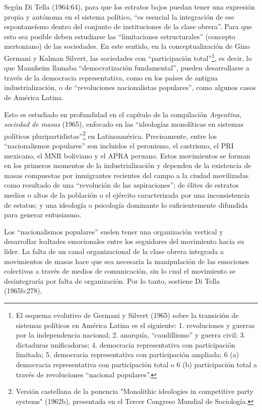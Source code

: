 Según Di Tella (1964:64), para que los estratos bajos puedan tener una expresión propia y autónoma en el sistema político, ``es esencial la integración de ese espontaneísmo dentro del conjunto de instituciones de la clase obrera''. Para que esto sea posible deben estudiarse las ``limitaciones estructurales'' (concepto mertoniano) de las sociedades. En este sentido, en la conceptualización de Gino Germani y Kalman Silvert, las sociedades con ``participación total''\footnote{El esquema evolutivo de Germani y Silvert (1965) sobre la transición de sistemas políticos en América Latina es el siguiente: 1. revoluciones y guerras por la independencia nacional; 2. anarquía, ``caudillismo'' y guerra civil; 3. dictaduras unificadoras; 4. democracia representativa con participación limitada; 5. democracia representativa con participación ampliada; 6 (a) democracia representativa con participación total o 6 (b) participación total a través de revoluciones ``nacional populares''.}, es decir, lo que Mannheim llamaba ``democratización fundamental'', pueden desarrollarse a través de la democracia representativa, como en los países de antigua industrialización, o de ``revoluciones nacionalistas populares'', como algunos casos de América Latina.

Esto es estudiado en profundidad en el capítulo de la compilación \emph{Argentina, sociedad de masas} (1965), enfocado en las ``ideologías monolíticas en sistemas políticos pluripartidistas''\footnote{Versión castellana de la ponencia "Monolithic ideologies in competitive party systems" (1962b), presentada en el Tercer Congreso Mundial de Sociología.} en Latinoamérica. Precisamente, entre los ``nacionalismos populares'' son incluidos el peronismo, el castrismo, el PRI mexicano, el MNR boliviano y el APRA peruano. Estos movimientos se forman en los primeros momentos de la industrialización y dependen de la existencia de masas compuestas por inmigrantes recientes del campo a la ciudad movilizadas como resultado de una ``revolución de las aspiraciones''; de élites de estratos medios o altos de la población o el ejército caracterizada por una inconsistencia de estatus; y una ideología o psicología dominante lo suficientemente difundida para generar entusiasmo.

Los ``nacionalismos populares'' suelen tener una organización vertical y desarrollar lealtades emocionales entre los seguidores del movimiento hacia su líder. La falta de un canal organizacional de la clase obrera integrada a movimientos de masas hace que sea necesaria la manipulación de las emociones colectivas a través de medios de comunicación, sin lo cual el movimiento se desintegraría por falta de organización. Por lo tanto, sostiene Di Tella (1965b:278),


